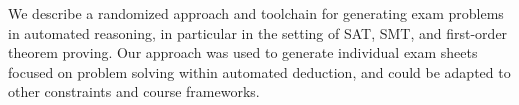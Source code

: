 We describe a randomized approach and toolchain for generating exam problems in
automated reasoning, in particular in the setting of SAT, SMT, and first-order theorem
proving. Our approach was used to generate individual exam sheets focused on
problem solving within automated deduction, and could be adapted to other
constraints and course frameworks.
